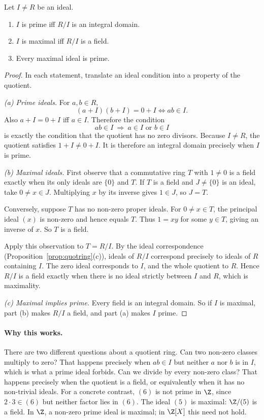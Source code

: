\begin{proposition}\label{prop:primemax}
Let $I\ne R$ be an ideal.
\begin{enumerate}[label=(\alph*)]
\item $I$ is prime iff $R/I$ is an integral domain.
\item $I$ is maximal iff $R/I$ is a field.
\item Every maximal ideal is prime.
\end{enumerate}
\end{proposition}
\begin{proof}
In each statement, translate an ideal
condition into a property of the quotient.

\emph{(a) Prime ideals.}
For $a,b\in R$,
\[
(a+I)(b+I)=0+I
\iff ab\in I.
\]
Also $a+I=0+I$ iff $a\in I$.
Therefore the condition
\[
ab\in I\ \Longrightarrow\ a\in I
\text{ or }b\in I
\]
is exactly the condition that the quotient
has no zero divisors. Because $I\ne R$,
the quotient satisfies $1+I\ne0+I$.
It is therefore an integral domain
precisely when $I$ is prime.

\emph{(b) Maximal ideals.}
First observe that a commutative ring
$T$ with $1\ne0$ is a field exactly
when its only ideals are $\{0\}$ and $T$.
If $T$ is a field and $J\ne\{0\}$
is an ideal, take $0\ne x\in J$.
Multiplying $x$ by its inverse gives
$1\in J$, so $J=T$.

Conversely, suppose $T$ has no
non-zero proper ideals. For
$0\ne x\in T$, the principal ideal
$(x)$ is non-zero and hence equals $T$.
Thus $1=xy$ for some $y\in T$,
giving an inverse of $x$.
So $T$ is a field.

Apply this observation to $T=R/I$.
By the ideal correspondence
(Proposition~\ref{prop:quotring}(c)),
ideals of $R/I$ correspond precisely
to ideals of $R$ containing $I$.
The zero ideal corresponds to $I$,
and the whole quotient to $R$.
Hence $R/I$ is a field exactly when
there is no ideal strictly between
$I$ and $R$, which is maximality.

\emph{(c) Maximal implies prime.}
Every field is an integral domain.
So if $I$ is maximal, part (b) makes
$R/I$ a field, and part (a) makes
$I$ prime.
\end{proof}

\paragraph{Why this works.}
There are two different questions about a quotient ring. Can two non-zero classes multiply to zero? That happens precisely when $ab\in I$ but neither $a$ nor $b$ is in $I$, which is what a prime ideal forbids. Can we divide by every non-zero class? That happens precisely when the quotient is a field, or equivalently when it has no non-trivial ideals. For a concrete contrast, $(6)$ is not prime in $\Z$, since $2\cdot3\in(6)$ but neither factor lies in $(6)$. The ideal $(5)$ is maximal: $\Z/(5)$ is a field. In $\Z$, a non-zero prime ideal is maximal; in $\Z[X]$ this need not hold.


